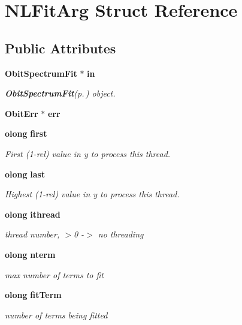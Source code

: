 \section{NLFit\-Arg Struct Reference}
\label{structNLFitArg}
\subsection*{Public Attributes}
\begin{CompactItemize}
\item 
{\bf Obit\-Spectrum\-Fit} $\ast$ {\bf in}
\begin{CompactList}\small\item\em {\bf Obit\-Spectrum\-Fit}{\rm (p.\,\pageref{structObitSpectrumFit})} object. \item\end{CompactList}\item 
{\bf Obit\-Err} $\ast$ {\bf err}
\item 
{\bf olong} {\bf first}
\begin{CompactList}\small\item\em First (1-rel) value in y to process this thread. \item\end{CompactList}\item 
{\bf olong} {\bf last}
\begin{CompactList}\small\item\em Highest (1-rel) value in y to process this thread. \item\end{CompactList}\item 
{\bf olong} {\bf ithread}
\begin{CompactList}\small\item\em thread number, $>$0 -$>$ no threading \item\end{CompactList}\item 
{\bf olong} {\bf nterm}
\begin{CompactList}\small\item\em max number of terms to fit \item\end{CompactList}\item 
{\bf olong} {\bf fit\-Term}
\begin{CompactList}\small\item\em number of terms being fitted \item\end{CompactList}\item 

\end{CompactItemize}

